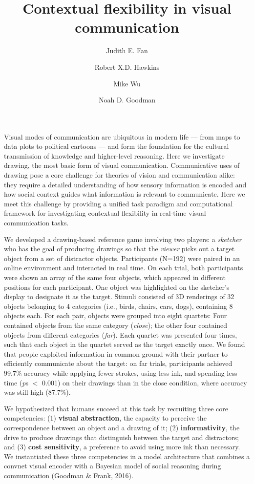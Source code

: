 \documentclass{article}
\title{Contextual flexibility in visual communication}
\author[a]{Judith E. Fan}
\author[a]{Robert X.D. Hawkins}
\author[b]{Mike Wu}
\author[a,b]{Noah D. Goodman}
\affil[a]{Department of Psychology, Stanford University}
\affil[b]{Department of Computer Science, Stanford University}
\begin{document}
\maketitle

Visual modes of communication are ubiquitous in modern life --- from maps to data plots to political cartoons --- and form the foundation for the cultural transmission of knowledge and higher-level reasoning. Here we investigate drawing, the most basic form of visual communication. Communicative uses of drawing pose a core challenge for theories of vision and communication alike: they require a detailed understanding of how sensory information is encoded and how social context guides what information is relevant to communicate. Here we meet this challenge by providing a unified task paradigm and computational framework for investigating contextual flexibility in real-time visual communication tasks.

We developed a drawing-based reference game involving two players: a \textit{sketcher} who has the goal of producing drawings so that the \textit{viewer} picks out a target object from a set of distractor objects. Participants (N=192) were paired in an online environment and interacted in real time. On each trial, both participants were shown an array of the same four objects, which appeared in different positions for each participant. One object was highlighted on the sketcher's display to designate it as the target. Stimuli consisted of 3D renderings of 32 objects belonging to 4 categories (i.e., birds, chairs, cars, dogs), containing 8 objects each. For each pair, objects were grouped into eight quartets: Four contained objects from the same category (\textit{close}); the other four contained objects from different categories (\textit{far}). Each quartet was presented four times, such that each object in the quartet served as the target exactly once. We found that people exploited information in common ground with their partner to efficiently communicate about the target: on far trials, participants achieved 99.7\% accuracy while applying fewer strokes, using less ink, and spending less time (\textit{p}s $<$ 0.001) on their drawings than in the close condition, where accuracy was still high (87.7\%). 

We hypothesized that humans succeed at this task by recruiting three core competencies: (1) \textbf{visual abstraction}, the capacity to perceive the correspondence between an object and a drawing of it; (2) \textbf{informativity}, the drive to produce drawings that distinguish between the target and distractors; and (3) \textbf{cost sensitivity}, a preference to avoid using more ink than necessary. We instantiated these three competencies in a model architecture that combines a convnet visual encoder with a Bayesian model of social reasoning during communication (Goodman \& Frank, 2016).
\end{document}
